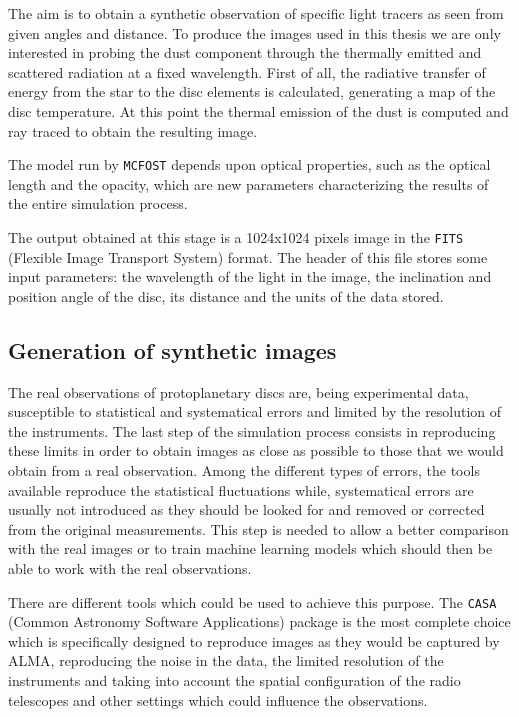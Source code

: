 \documentclass[a4paper,10pt]{report}
\begin{document}
The aim is to obtain a synthetic observation of specific light tracers as seen from given angles and distance.
To produce the images used in this thesis we are only interested in probing the dust component through the thermally
emitted and scattered radiation at a fixed wavelength.
First of all, the radiative transfer of energy from the star to the disc elements is calculated, generating a map of the disc temperature.
At this point the thermal emission of the dust is computed and ray traced to obtain the resulting image.

The model run by \lstinline{MCFOST} depends upon optical properties, such as the optical length and the opacity, which 
are new parameters characterizing the results of the entire simulation process.

The output obtained at this stage is a 1024x1024 pixels image in the
\lstinline{FITS} (Flexible Image Transport System) format.
The header of this file stores some input parameters: 
the wavelength of the light in the image, the inclination and position angle of
the disc, its distance and the units of the data stored.

\subsection{Generation of synthetic images}

The real observations of protoplanetary discs are, being experimental data, susceptible 
to statistical and systematical errors and limited by the resolution of the instruments.
The last step of the simulation process consists in reproducing these limits in order
to obtain images as close as possible to those that we would obtain from a real observation.
Among the different types of errors, the tools available reproduce the
statistical fluctuations while, systematical errors are usually not introduced as they should be 
looked for and removed or corrected from the original measurements.
This step is needed to allow a better comparison with the real images or to train machine learning 
models which should then be able to work with the real observations.

There are different tools which could be used to achieve this purpose.
The \lstinline{CASA} (Common Astronomy Software Applications) package is the most complete choice 
which is specifically designed to reproduce images as they would be captured by ALMA, reproducing the noise in the data,
the limited resolution of the instruments and taking into account the spatial configuration of the radio telescopes
and other settings which could influence the observations.
\end{document}
